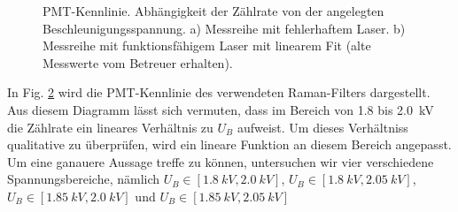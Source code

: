 \documentclass[11pt]{article}
\begin{document}
\begin{figure}[htbp]
    \centering
    \begin{subfigure}{0.45\textwidth}
        \centering
        \caption{}
        \label{fig:fehler}
    \end{subfigure}
    \hfill
    \begin{subfigure}{0.45\textwidth}
        \centering
        \caption{}
        \label{fig:gegeben}
    \end{subfigure}
    \caption{PMT-Kennlinie. Abhängigkeit der Zählrate von der angelegten Beschleunigungsspannung. a) Messreihe mit fehlerhaftem Laser. b) Messreihe mit funktionsfähigem Laser mit linearem Fit (alte Messwerte vom Betreuer erhalten).}
    \label{fig:PMT_Kennlinie}
\end{figure}

In Fig. \ref{fig:gegeben} wird die PMT-Kennlinie des verwendeten Raman-Filters dargestellt. Aus diesem Diagramm lässt sich vermuten, dass im Bereich von \num{1.8} bis \SI{2.0}{\kilo\volt} die Zählrate ein lineares Verhältnis zu $U_B$ aufweist. Um dieses Verhältniss qualitative zu überprüfen, wird ein lineare Funktion an diesem Bereich angepasst. Um eine ganauere Aussage treffe zu können, untersuchen wir vier verschiedene Spannungsbereiche, nämlich $U_B \in [\SI{1.8}{kV}, \SI{2.0}{kV}]$, $U_B \in [\SI{1.8}{kV}, \SI{2.05}{kV}]$, $U_B \in [\SI{1.85}{kV}, \SI{2.0}{kV}]$ und $U_B \in [\SI{1.85}{kV}, \SI{2.05}{kV}]$
\end{document}
